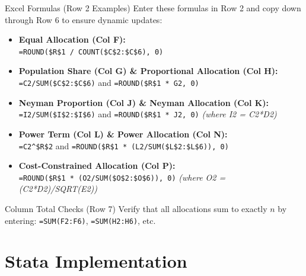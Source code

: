\documentclass[10pt, aspectratio=169]{beamer}
\begin{document}
  \begin{frame}{Excel Formulas (Row 2 Examples)}
      Enter these formulas in Row 2 and copy down through Row 6 to ensure dynamic updates:
      \vspace{0.3cm}
      \begin{itemize}
          \item \textbf{Equal Allocation (Col F):} \\
          \texttt{=ROUND(\$R\$1 / COUNT(\$C\$2:\$C\$6), 0)}
          \item \textbf{Population Share (Col G) \& Proportional Allocation (Col H):} \\
          \texttt{=C2/SUM(\$C\$2:\$C\$6)} \quad and \quad \texttt{=ROUND(\$R\$1 * G2, 0)}
          \item \textbf{Neyman Proportion (Col J) \& Neyman Allocation (Col K):} \\
          \texttt{=I2/SUM(\$I\$2:\$I\$6)} \quad and \quad \texttt{=ROUND(\$R\$1 * J2, 0)} \quad \textit{(where I2 = C2*D2)}
          \item \textbf{Power Term (Col L) \& Power Allocation (Col N):} \\
          \texttt{=C2\textasciicircum\$R\$2} \quad and \quad \texttt{=ROUND(\$R\$1 * (L2/SUM(\$L\$2:\$L\$6)), 0)}
          \item \textbf{Cost-Constrained Allocation (Col P):} \\
          \texttt{=ROUND(\$R\$1 * (O2/SUM(\$O\$2:\$O\$6)), 0)} \quad \textit{(where O2 = (C2*D2)/SQRT(E2))}
      \end{itemize}
      \vspace{0.2cm}
      \begin{block}{Column Total Checks (Row 7)}
          Verify that all allocations sum to exactly $n$ by entering: \texttt{=SUM(F2:F6)}, \texttt{=SUM(H2:H6)}, etc.
      \end{block}
  \end{frame}
  
  \section{Stata Implementation}
  
\end{document}
